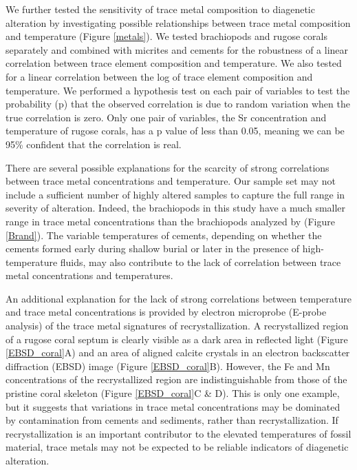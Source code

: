 \documentclass{article}
\begin{document}
We further tested the sensitivity of trace metal composition to diagenetic alteration by investigating possible relationships between trace metal composition and temperature (Figure \ref{metals}). We tested brachiopods and rugose corals separately and combined with micrites and cements for the robustness of a linear correlation between trace element composition and temperature. We also tested for a linear correlation between the log of trace element composition and temperature. We performed a hypothesis test on each pair of variables to test the probability (p) that the observed correlation is due to random variation when the true correlation is zero. Only one pair of variables, the Sr concentration and temperature of rugose corals, has a p value of less than 0.05, meaning we can be 95\% confident that the correlation is real. 

There are several possible explanations for the scarcity of strong correlations between trace metal concentrations and temperature. Our sample set may not include a sufficient number of highly altered samples to capture the full range in severity of alteration. Indeed, the brachiopods in this study have a much smaller range in trace metal concentrations than the brachiopods analyzed by \cite{Brand2012} (Figure \ref{Brand}). The variable temperatures of cements, depending on whether the cements formed early during shallow burial or later in the presence of high-temperature fluids, may also contribute to the lack of correlation between trace metal concentrations and temperatures. 

An additional explanation for the lack of strong correlations between temperature and trace metal concentrations is provided by electron microprobe (E-probe analysis) of the trace metal signatures of recrystallization. A recrystallized region of a rugose coral septum is clearly visible as a dark area in reflected light (Figure \ref{EBSD_coral}A) and an area of aligned calcite crystals in an electron backscatter diffraction (EBSD) image (Figure \ref{EBSD_coral}B). However, the Fe and Mn concentrations of the recrystallized region are indistinguishable from those of the pristine coral skeleton (Figure \ref{EBSD_coral}C \& D). This is only one example, but it suggests that variations in trace metal concentrations may be dominated by contamination from cements and sediments, rather than recrystallization. If recrystallization is an important contributor to the elevated temperatures of fossil material, trace metals may not be expected to be reliable indicators of diagenetic alteration.
\end{document}
